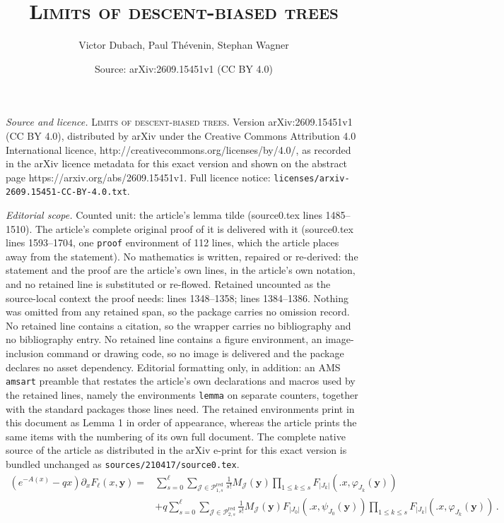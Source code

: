 \documentclass[10pt,a4paper]{amsart}
\title{\textsc{Limits of descent-biased trees}}
\author{Victor Dubach, Paul Th\'evenin, Stephan Wagner}
\date{Source: arXiv:2609.15451v1 (CC BY 4.0)}
\newcommand{\abs}[1]{{\left|#1\right|}}
\newcommand{\by}{{\mathbf{y}}}
\newcommand{\cJ}{\mathcal{J}}
\newcommand{\cP}{\mathcal{P}}
\newcommand{\red}{\mathrm{red}}
\begin{document}
\maketitle

\noindent\emph{Source and licence.} \textsc{Limits of descent-biased trees}. Version arXiv:2609.15451v1 (CC BY 4.0), distributed by arXiv under the Creative Commons Attribution 4.0 International licence, http://creativecommons.org/licenses/by/4.0/, as recorded in the arXiv licence metadata for this exact version and shown on the abstract page https://arxiv.org/abs/2609.15451v1. Full licence notice: \texttt{licenses/arxiv-2609.15451-CC-BY-4.0.txt}.\par\smallskip

\noindent\textit{Editorial scope.} Counted unit: the article's lemma tilde (source0.tex lines 1485--1510). The article's complete original proof of it is delivered with it (source0.tex lines 1593--1704, one \texttt{proof} environment of 112 lines, which the article places away from the statement). No mathematics is written, repaired or re-derived: the statement and the proof are the article's own lines, in the article's own notation, and no retained line is substituted or re-flowed.  Retained uncounted as the source-local context the proof needs: lines 1348--1358; lines 1384--1386.  Nothing was omitted from any retained span, so the package carries no omission record.  No retained line contains a citation, so the wrapper carries no bibliography and no bibliography entry.  No retained line contains a figure environment, an image-inclusion command or drawing code, so no image is delivered and the package declares no asset dependency.  Editorial formatting only, in addition: an AMS \texttt{amsart} preamble that restates the article's own declarations and macros used by the retained lines, namely the environments \texttt{lemma} on separate counters, together with the standard packages those lines need.  The retained environments print in this document as Lemma 1 in order of appearance, whereas the article prints the same items with the numbering of its own full document.  The complete native source of the article as distributed in the arXiv e-print for this exact version is bundled unchanged as \texttt{sources/210417/source0.tex}.
\begin{align}\label{eq: equadiff on Fell with everything}
    \left( e^{-A(x)} - qx \right)
    \partial_x F_\ell(x,\by)
    = &\sum_{s=0}^\ell \sum_{\cJ\in \cP_{1,s}^\red} \frac{1}{s!} 
    M_\cJ(\by)
    \prod_{1\le k\le s} F_{\abs{J_k}}\left(\big. x , \varphi_{J_k}(\by) \right) \nonumber\\
    &+ q \sum_{s=0}^\ell \sum_{\cJ\in \cP_{2,s}^\red} \frac{1}{s!} 
    M_\cJ(\by)
    F_{\abs{J_0}}\left(\big. x , \psi_{J_0}(\by) \right)
    \prod_{1\le k\le s} F_{\abs{J_k}}\left(\big. x , \varphi_{J_k}(\by) \right) \,.
\end{align}
\end{document}
